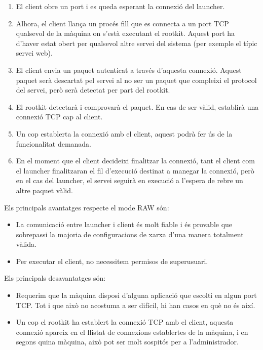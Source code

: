\begin{enumerate}
    \item El client obre un port i es queda esperant la connexió del launcher.
    \item Alhora, el client llança un procés fill que es connecta a un port TCP qualsevol de la màquina on s'està 
        executant el rootkit. Aquest port ha d'haver estat obert per qualsevol altre servei del sistema (per 
        exemple el típic servei web).
    \item El client envia un paquet autenticat a través d'aquesta connexió. Aquest paquet serà   
        descartat pel servei al no ser un paquet que compleixi el protocol del servei, però serà detectat per
        part del rootkit. 
    \item El rootkit detectarà i comprovarà el paquet. En cas de ser vàlid, establirà una connexió TCP cap 
        al client.
    \item Un cop establerta la connexió amb el client, aquest podrà fer ús de la funcionalitat demanada. 
    \item En el moment que el client decideixi finalitzar la connexió, tant el client com el launcher finalitzaran el
        fil d'execució destinat a manegar la connexió, però en el cas del launcher, el servei seguirà en execució
        a l'espera de rebre un altre paquet vàlid.
\end{enumerate}

Els principals avantatges respecte el mode RAW són: \\
\begin{itemize}
    \item La comunicació entre launcher i client és molt fiable i és provable que sobrepassi la majoria de 
        configuracions de xarxa d'una manera totalment vàlida.
    \item Per executar el client, no necessitem permisos de superusuari. \\
\end{itemize}

Els principals desavantatges són: \\
\begin{itemize}
    \item Requerim que la màquina disposi d'alguna aplicació que escolti en algun port 
        TCP. Tot i que això no acostuma a ser difícil, hi han casos en què no és així.
    \item Un cop el rootkit ha establert la connexió TCP amb el client, aquesta connexió
        apareix en el llistat de connexions establertes de la màquina, i en segons quina màquina, això
        pot ser molt sospitós per a l'administrador.
\end{itemize}

